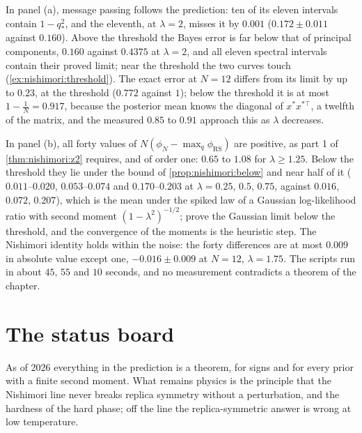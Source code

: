 \begin{refsection}
In panel (a), message passing follows the prediction: ten of its eleven intervals contain $1-q_*^2$, and the eleventh, at $\lambda=2$, misses it by $0.001$ ($0.172\pm0.011$ against $0.160$). Above the threshold the Bayes error is far below that of principal components, $0.160$ against $0.4375$ at $\lambda=2$, and all eleven spectral intervals contain their proved limit; near the threshold the two curves touch (\cref{ex:nishimori:threshold}). The exact error at $N=12$ differs from its limit by up to $0.23$, at the threshold ($0.772$ against $1$); below the threshold it is at most $1-\frac1N=0.917$, because the posterior mean knows the diagonal of $x^*x^{*\top}$, a twelfth of the matrix, and the measured $0.85$ to $0.91$ approach this as $\lambda$ decreases.

In panel (b), all forty values of $N(\phi_N-\max_q\phi_{\mathrm{RS}})$ are positive, as part 1 of \cref{thm:nishimori:z2} requires, and of order one: $0.65$ to $1.08$ for $\lambda\ge1.25$. Below the threshold they lie under the bound of \cref{prop:nishimori:below} and near half of it ($0.011$--$0.020$, $0.053$--$0.074$ and $0.170$--$0.203$ at $\lambda=0.25$, $0.5$, $0.75$, against $0.016$, $0.072$, $0.207$), which is the mean under the spiked law of a Gaussian log-likelihood ratio with second moment $(1-\lambda^2)^{-1/2}$; \textcite{ElAlaouiKrzakalaJordan2020} prove the Gaussian limit below the threshold, and the convergence of the moments is the heuristic step. The Nishimori identity holds within the noise: the forty differences are at most $0.009$ in absolute value except one, $-0.016\pm0.009$ at $N=12$, $\lambda=1.75$. The scripts run in about $45$, $55$ and $10$ seconds, and no measurement contradicts a theorem of the chapter.

\section{The status board}\label{sec:nishimori:status}

As of 2026 everything in the prediction is a theorem, for signs and for every prior with a finite second moment. What remains physics is the principle that the Nishimori line never breaks replica symmetry without a perturbation, and the hardness of the hard phase; off the line the replica-symmetric answer is wrong at low temperature.


\end{refsection}
